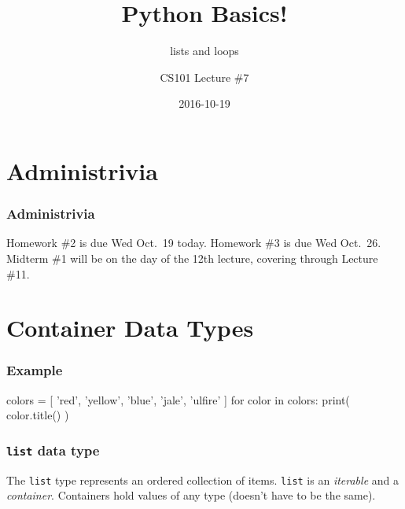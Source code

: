 \documentclass[11pt]{beamer}
\title{Python Basics!}
\subtitle{lists and loops}
\author{CS101 Lecture \#7}
\date{2016-10-19}
\begin{document}
  \setcounter{showProgressBar}{0}
  \setcounter{showSlideNumbers}{0}

\frame{\titlepage}

\setcounter{framenumber}{0}
\setcounter{showProgressBar}{1}
\setcounter{showSlideNumbers}{1}

\section{Administrivia}

\begin{frame}
  \frametitle{Administrivia}
  \Enlarge
  \begin{itemize}
  \myitem  Homework \#2 is due Wed Oct.\ 19 today.
  \myitem  Homework \#3 is due Wed Oct.\ 26.
  \myitem  Midterm \#1 will be on the day of the 12th lecture, covering through Lecture \#11.  
  \end{itemize}
\end{frame}


\section{Container Data Types}

\begin{frame}[fragile]
  \frametitle{Example}
  \Enlarge

  \begin{semiverbatim}
colors = [ 'red', 'yellow', 'blue',
           'jale', 'ulfire' ]
for color in colors:
    print( color.title() )
  \end{semiverbatim}
\end{frame}

\begin{frame}[fragile]
  \frametitle{\texttt{list} data type}
  \Enlarge

  \begin{itemize}
  \myitem  The \texttt{list} type represents an ordered collection of items. %
  \myitem  \texttt{list} is an \emph{iterable} and a \emph{container}. %
  \myitem  Containers hold values of any type (doesn't have to be the same).
  \end{itemize}
\end{frame}
\end{document}
